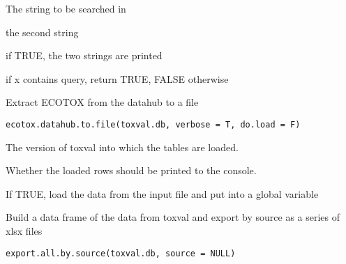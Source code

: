 \documentclass[letterpaper]{book}
\begin{document}
%
\begin{Arguments}
\begin{ldescription}
\item[\code{x}] The string to be searched in

\item[\code{query}] the second string

\item[\code{verbose}] if TRUE, the two strings are printed
\end{ldescription}
\end{Arguments}
%
\begin{Value}
if x contains query, return TRUE, FALSE otherwise
\end{Value}
%
\begin{Description}\relax
Extract ECOTOX from the datahub to a file
\end{Description}
%
\begin{Usage}
\begin{verbatim}
ecotox.datahub.to.file(toxval.db, verbose = T, do.load = F)
\end{verbatim}
\end{Usage}
%
\begin{Arguments}
\begin{ldescription}
\item[\code{toxval.db}] The version of toxval into which the tables are loaded.

\item[\code{verbose}] Whether the loaded rows should be printed to the console.

\item[\code{do.load}] If TRUE, load the data from the input file and put into a global variable
\end{ldescription}
\end{Arguments}
%
\begin{Description}\relax
Build a data frame of the data from toxval and export by source as a
series of xlsx files
\end{Description}
%
\begin{Usage}
\begin{verbatim}
export.all.by.source(toxval.db, source = NULL)
\end{verbatim}
\end{Usage}
\end{document}
